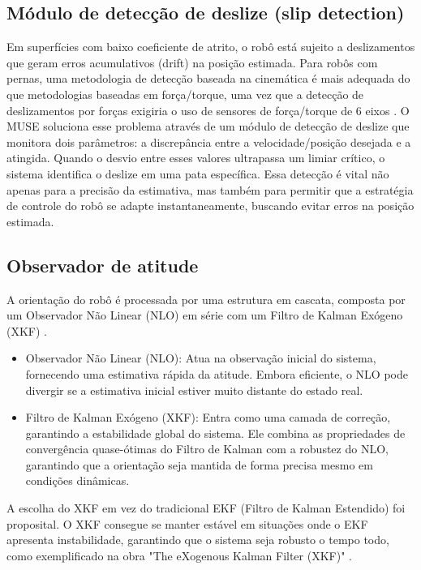 \subsection{Módulo de detecção de deslize (slip detection)}
Em superfícies com baixo coeficiente de atrito, o robô está sujeito a deslizamentos 
que geram erros acumulativos (drift) na posição estimada. Para robôs com pernas, 
uma metodologia de detecção baseada na cinemática é mais adequada do que metodologias 
baseadas em força/torque, uma vez que a detecção de deslizamentos por forças exigiria
 o uso de sensores de força/torque de 6 eixos \cite{nistico2022slip}.
O MUSE soluciona esse 
problema através de um módulo de detecção de deslize que monitora dois parâmetros: 
a discrepância entre a velocidade/posição desejada e a atingida. Quando o desvio 
entre esses valores ultrapassa um limiar crítico, o sistema identifica o deslize 
em uma pata específica. Essa detecção é vital não apenas para a precisão da 
estimativa, mas também para permitir que a estratégia de controle do robô se 
adapte instantaneamente, buscando evitar erros na posição estimada. \cite{nistico2022slip}

\subsection{Observador de atitude}
A orientação do robô é processada por uma estrutura em cascata, 
composta por um Observador Não Linear (NLO) em série com um Filtro de Kalman 
Exógeno (XKF) \cite{fink2020proprioceptive}.

\begin{itemize}
    \item Observador Não Linear (NLO): Atua na observação inicial do sistema, 
    fornecendo uma estimativa rápida da atitude. Embora eficiente, o NLO pode 
    divergir se a estimativa inicial estiver muito distante do estado real.
    \item Filtro de Kalman Exógeno (XKF): Entra como uma camada de correção, 
    garantindo a estabilidade global do sistema. Ele combina as propriedades de 
    convergência quase-ótimas do Filtro de Kalman com a robustez do NLO, 
    garantindo que a orientação seja mantida de forma precisa mesmo em condições 
    dinâmicas.
\end{itemize}

A escolha do XKF em vez do tradicional EKF (Filtro de Kalman Estendido) foi 
proposital. O XKF consegue se manter estável em situações onde o EKF apresenta 
instabilidade, garantindo que o sistema seja robusto o tempo todo, como exemplificado 
na obra "The eXogenous Kalman Filter (XKF)" \cite{johansen2017xkf}.



